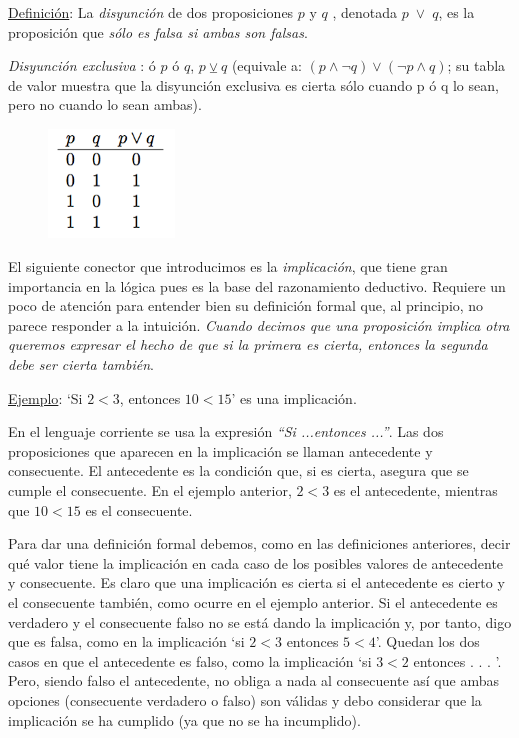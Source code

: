 \begin{multicols}{2}
\underline{Definición}: La \emph{disyunción} de dos proposiciones $p$ y $q$ , denotada $p \;  \vee \;  q$, es la proposición que \emph{sólo es falsa si ambas son falsas}.

\small{\emph{Disyunción exclusiva} :  ó $p$ ó $q$,   $p \veebar q$ (equivale a:  $(p \wedge \neg  q) \vee( \neg p \wedge q)$; su tabla de valor muestra que la disyunción exclusiva es cierta sólo cuando p ó q lo sean, pero no cuando lo sean ambas)}\normalsize{.}
\begin{figure}[H] 
		\centering
		\includegraphics[width=0.3\textwidth]{imagenes/apendices/APENDICESIM15.png}
	\end{figure}
\end{multicols}

El siguiente conector que introducimos es la \emph{implicación}, que tiene gran importancia en la lógica pues es la base del razonamiento deductivo. Requiere un poco de atención para entender bien su definición formal que, al principio, no parece responder a la intuición. \emph{Cuando decimos que una proposición implica otra queremos expresar el hecho de que si la primera es cierta, entonces la segunda debe ser cierta también}.

\underline{Ejemplo}: `Si $2 < 3$, entonces $10 < 15$' es una implicación.

En el lenguaje corriente se usa la expresión \emph{“Si ...entonces ...”}. Las dos proposiciones que aparecen en la implicación se llaman antecedente y consecuente. El antecedente es la condición que, si es cierta, asegura que se cumple el consecuente. En el ejemplo anterior, $2 < 3$ es el antecedente, mientras que $10 < 15$ es el consecuente.

Para dar una definición formal debemos, como en las definiciones anteriores, decir qué valor tiene la implicación en cada caso de los posibles valores de antecedente y consecuente. Es claro que una implicación es cierta si el antecedente es cierto y el consecuente también, como ocurre en el ejemplo anterior. Si el antecedente es verdadero y el consecuente falso no se está dando la implicación y, por tanto, digo que es falsa, como en la implicación `si $2 < 3$ entonces $5 < 4$'. Quedan los dos casos en que el antecedente es falso, como la implicación `si $3 < 2$ entonces . . . '. Pero, siendo falso el antecedente, no obliga a nada al consecuente así que ambas opciones (consecuente verdadero o falso) son válidas y debo considerar que la implicación se ha cumplido (ya que no se ha incumplido).

